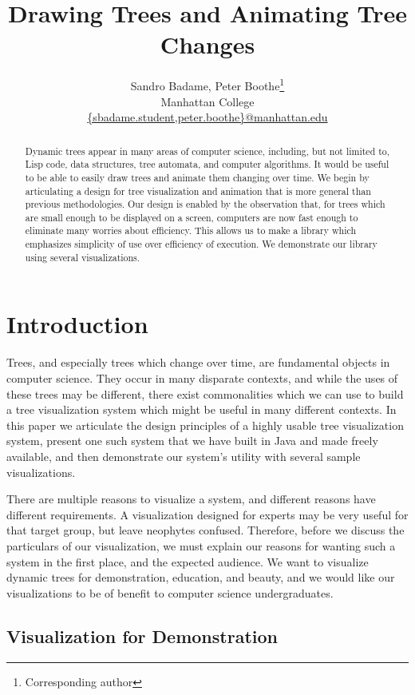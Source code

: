 \documentclass{article}
\title{Drawing Trees and Animating Tree Changes}
\author{Sandro Badame, Peter Boothe\footnote{Corresponding author}\\
 Manhattan College\\
\url{{sbadame.student,peter.boothe}@manhattan.edu}}
\begin{document}
\maketitle

\begin{abstract} Dynamic trees appear in many areas of computer science,
including, but not limited to, Lisp code, data structures, tree automata, and
computer algorithms.  It would be useful to be able to easily draw trees and
animate them changing over time.  We begin by articulating a design for tree
visualization and animation that is more general than previous methodologies.
Our design is enabled by the observation that, for trees which are small enough
to be displayed on a screen, computers are now fast enough to eliminate many
worries about efficiency.  This allows us to make a library which emphasizes
simplicity of use over efficiency of execution.  We demonstrate our library
using several visualizations.\end{abstract}

\section{Introduction}
Trees, and especially trees which change over time, are fundamental objects in
computer science.  They occur in many disparate contexts, and while the uses of
these trees may be different, there exist commonalities which we can use to
build a tree visualization system which might be useful in many different
contexts.  In this paper we articulate the design principles of a highly usable
tree visualization system, present one such system that we have built in Java
and made freely available, and then demonstrate our system's utility with
several sample visualizations.

There are multiple reasons to visualize a system, and different reasons have
different requirements.  A visualization designed for experts may be very
useful for that target group, but leave neophytes confused.  Therefore, before
we discuss the particulars of our visualization, we must explain our reasons
for wanting such a system in the first place, and the expected audience.  We
want to visualize dynamic trees for demonstration, education, and beauty, and
we would like our visualizations to be of benefit to computer science
undergraduates.

\subsection{Visualization for Demonstration}
\end{document}
